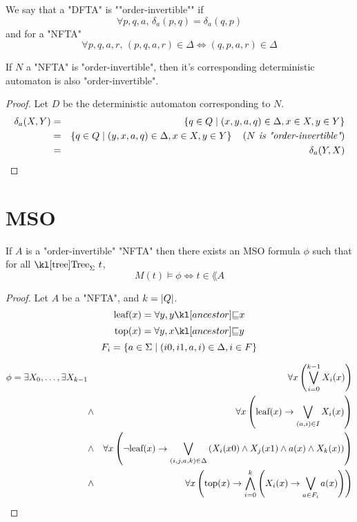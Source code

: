\documentclass{article}
\begin{document}
\begin{definition}
	We say that a "DFTA" is ""order-invertible"" if
	$$ \forall p,q,a,\, \delta_a (p,q) = \delta_a (q,p) $$
	and for a "NFTA"
	$$ \forall p,q,a,r,\, (p,q,a,r) \in \Delta \iff  (q,p,a,r) \in \Delta $$

\end{definition}


\begin{lemma}
	If $N$ a "NFTA" is "order-invertible", then it's corresponding deterministic automaton is also "order-invertible".
\end{lemma}

\begin{proof}
	Let $D$ be the deterministic automaton corresponding to $N$.
	\begin{eqnarray*}
		\delta_a (X,Y) &=& \left\{q \in Q \mid (x,y,a,q) \in \Delta, x \in X, y \in Y\right\} \\
		&=& \left\{q \in Q \mid (y,x,a,q) \in \Delta, x \in X, y \in Y\right\}  \quad\left(\textit{$N$ is "order-invertible"}\right) \\
		&=& \delta_a (Y,X)
	\end{eqnarray*}
\end{proof}

\section{MSO}

\begin{theorem}
	If $A$ is a "order-invertible" "NFTA"  then there exists an MSO formula $\phi$ such that for all $\tree_{\Sigma} \ t$,
	$$ M(t) \models \phi \iff t \in \lang A$$
\end{theorem}

\begin{proof}
	Let $A$ be a "NFTA", and $k = \left|Q\right|$.
	$$\text{leaf} (x) = \forall y, \ancestor y x$$
	$$\text{top} (x) = \forall y, \ancestor x y$$
	$$F_i = \left\{a \in \Sigma \mid (i0,i1,a,i) \in \Delta, i \in F\right\}$$


	\begin{eqnarray*}
		\phi = \exists X_0,\ldots, \exists X_{k-1} &\ & \forall x \left( \bigvee_{i=0}^{k-1} X_i(x) \right) \\
		&\land& \forall x \left( \text{leaf} (x) \rightarrow \bigvee_{(a,i)\in I}  X_i(x)   \right) \\
		&\land& \forall x \left(\lnot \text{leaf}(x) \rightarrow \bigvee_{(i,j,a,k)\in \Delta}  \left(X_i(x0) \land X_j(x1) \land a(x) \land X_k(x)\right)\right) \\
		&\land& \forall x \left(\text{top}(x) \rightarrow \bigwedge_{i= 0}^k \left( X_i(x) \rightarrow \bigvee_{a \in F_i} a(x) \right)\right)
	\end{eqnarray*}


\end{proof}





\end{document}
